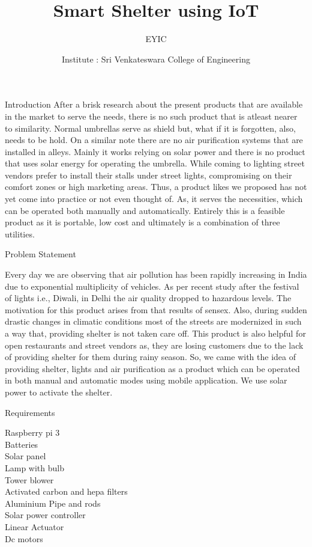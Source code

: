 \documentclass[10pt]{beamer}
\title{Smart Shelter using IoT}
\subtitle{EYIC}
\date{}
\author{Institute : Sri Venkateswara College of Engineering}
\institute{\textbf{TEAM}\\S.AFZAL\\S.ASLAM\\S.SUBRAMANYAM\\S.SRUJANA\\\\\textbf{MENTOR}\\P.M.D.ALI KHAN}
\begin{document}
\maketitle


\begin{frame}[fragile]{Introduction}
After a brisk research about the present products that are available in the market to serve the needs, there is
no such product that is atleast nearer to similarity. Normal umbrellas serve as shield but, what if it is
forgotten, also, needs to be hold. On a similar note there are no air purification systems that are installed in
alleys. Mainly it works relying on solar power and there is no product that uses solar energy for operating
the umbrella. While coming to lighting street vendors prefer to install their stalls under street lights,
compromising on their comfort zones or high marketing areas. Thus, a product likes we proposed has not yet
come into practice or not even thought of. As, it serves the necessities, which can be operated both manually
and automatically. Entirely this is a feasible product as it is portable, low cost and ultimately is a
combination of three utilities.
\end{frame}
\begin{frame}[fragile]{Problem Statement}

  Every day we are observing that air pollution has been rapidly increasing in India due to exponential
multiplicity of vehicles. As per recent study after the festival of lights i.e., Diwali, in Delhi the air quality
dropped to hazardous levels. The motivation for this product arises from that results of sensex. Also, during
sudden drastic changes in climatic conditions most of the streets are modernized in such a way that,
providing shelter is not taken care off. This product is also helpful for open restaurants and street vendors as,
they are losing customers due to the lack of providing shelter for them during rainy season. So, we came
with the idea of providing shelter, lights and air purification as a product which can be operated in both
manual and automatic modes using mobile application. We use solar power to activate the shelter.
\end{frame}
\begin{frame}[fragile]{Requirements}

Raspberry pi 3\\
Batteries\\
Solar panel\\
Lamp with bulb\\
Tower blower\\
Activated carbon and hepa filters\\
Aluminium Pipe and rods\\
Solar power controller\\
Linear Actuator\\
Dc motors\\
\end{frame}
\end{document}
